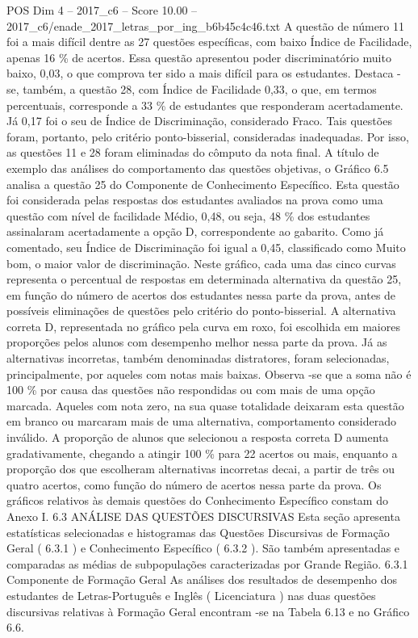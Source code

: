 \begin{textsample}{POS Dim 4 – 2017\_c6 – Score 10.00 – 2017\_c6/enade\_2017\_letras\_por\_ing\_b6b45c4c46.txt}
A questão de número 11 foi a mais difícil dentre as 27 questões específicas, com baixo Índice de Facilidade, apenas 16 \% de acertos.
Essa questão apresentou poder discriminatório muito baixo, 0,03, o que comprova ter sido a mais difícil para os estudantes.
Destaca -se, também, a questão 28, com Índice de Facilidade 0,33, o que, em termos percentuais, corresponde a 33 \% de estudantes que responderam acertadamente.
Já 0,17 foi o seu de Índice de Discriminação, considerado Fraco.
Tais questões foram, portanto, pelo critério ponto-bisserial, consideradas inadequadas.
Por isso, as questões 11 e 28 foram eliminadas do cômputo da nota final.
A título de exemplo das análises do comportamento das questões objetivas, o Gráfico 6.5 analisa a questão 25 do Componente de Conhecimento Específico.
Esta questão foi considerada pelas respostas dos estudantes avaliados na prova como uma questão com nível de facilidade Médio, 0,48, ou seja, 48 \% dos estudantes assinalaram acertadamente a opção D, correspondente ao gabarito.
Como já comentado, seu Índice de Discriminação foi igual a 0,45, classificado como Muito bom, o maior valor de discriminação.
Neste gráfico, cada uma das cinco curvas representa o percentual de respostas em determinada alternativa da questão 25, em função do número de acertos dos estudantes nessa parte da prova, antes de possíveis eliminações de questões pelo critério do ponto-bisserial.
A alternativa correta D, representada no gráfico pela curva em roxo, foi escolhida em maiores proporções pelos alunos com desempenho melhor nessa parte da prova.
Já as alternativas incorretas, também denominadas distratores, foram selecionadas, principalmente, por aqueles com notas mais baixas.
Observa -se que a soma não é 100 \% por causa das questões não respondidas ou com mais de uma opção marcada.
Aqueles com nota zero, na sua quase totalidade deixaram esta questão em branco ou marcaram mais de uma alternativa, comportamento considerado inválido.
A proporção de alunos que selecionou a resposta correta D aumenta gradativamente, chegando a atingir 100 \% para 22 acertos ou mais, enquanto a proporção dos que escolheram alternativas incorretas decai, a partir de três ou quatro acertos, como função do número de acertos nessa parte da prova.
Os gráficos relativos às demais questões do Conhecimento Específico constam do Anexo I. 6.3 ANÁLISE DAS QUESTÕES DISCURSIVAS Esta seção apresenta estatísticas selecionadas e histogramas das Questões Discursivas de Formação Geral ( 6.3.1 ) e Conhecimento Específico ( 6.3.2 ).
São também apresentadas e comparadas as médias de subpopulações caracterizadas por Grande Região. 6.3.1 Componente de Formação Geral As análises dos resultados de desempenho dos estudantes de Letras-Português e Inglês ( Licenciatura ) nas duas questões discursivas relativas à Formação Geral encontram -se na Tabela 6.13 e no Gráfico 6.6.

\end{textsample}
